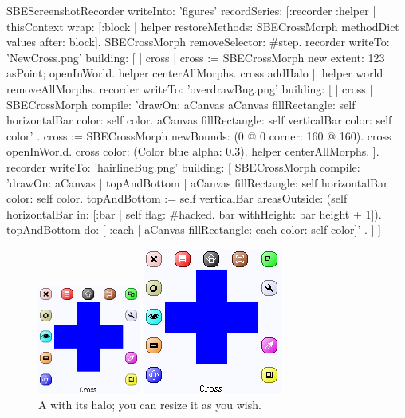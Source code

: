 \documentclass[a4paper,10pt,twoside]{book}
\begin{document}
\begin{ExecuteSmalltalkScript}
SBEScreenshotRecorder writeInto: 'figures' recordSeries: [:recorder :helper |
	thisContext wrap: [:block | helper restoreMethods: SBECrossMorph methodDict values after: block].
	SBECrossMorph removeSelector: #step.
	recorder writeTo: 'NewCross.png' building: [
		| cross |
		cross := SBECrossMorph new
			extent: 123 asPoint;
			openInWorld.
		helper centerAllMorphs.
		cross addHalo
	].
	helper world removeAllMorphs.
	recorder writeTo: 'overdrawBug.png' building: [
		| cross |
		SBECrossMorph compile: 'drawOn: aCanvas
	aCanvas fillRectangle: self horizontalBar color: self color.
	aCanvas fillRectangle: self verticalBar color: self color'
		.
		cross := SBECrossMorph newBounds: (0 @ 0 corner: 160 @ 160).
		cross openInWorld.
		cross color: (Color blue alpha: 0.3).
		helper centerAllMorphs.
	].
	recorder writeTo: 'hairlineBug.png' building: [
		SBECrossMorph
			compile: 'drawOn: aCanvas
	| topAndBottom |
	aCanvas fillRectangle: self horizontalBar color: self color.
	topAndBottom := self verticalBar areasOutside: (self horizontalBar in: [:bar |
		self flag: #hacked.
		bar withHeight: bar height + 1]).
	topAndBottom do: [ :each | aCanvas fillRectangle: each color: self color]'
			.
	]
]
\end{ExecuteSmalltalkScript}
\begin{figure}[hbt]
	\ifluluelse
		{\centerline{\includegraphics[width=0.3\textwidth]{NewCross}}}
		{\centerline{\includegraphics{NewCross}}}
	\caption{A  with its halo; you can resize it as you wish.
		\label{fig:cross}}
\end{figure}
\end{document}
